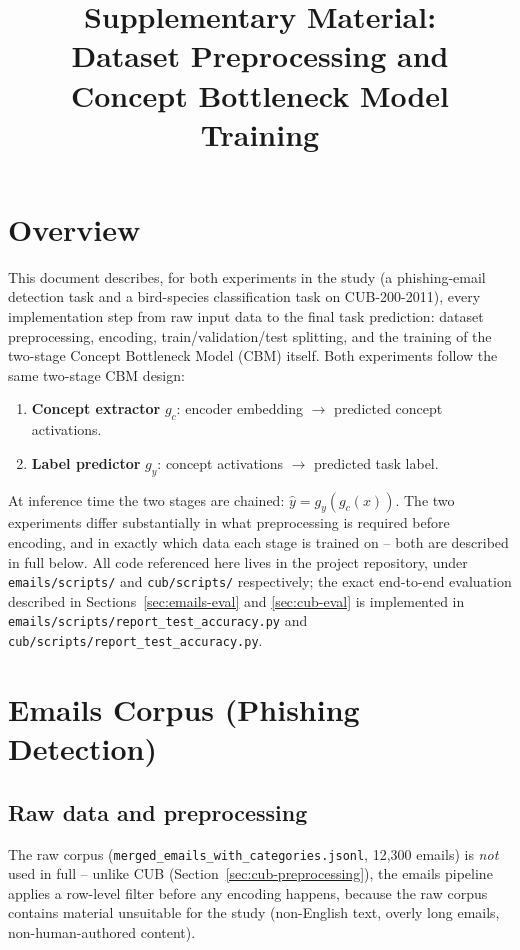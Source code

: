 \documentclass[11pt]{article}
\title{Supplementary Material:\\Dataset Preprocessing and Concept Bottleneck Model Training}
\author{}
\date{}
\newcommand{\code}[1]{\texttt{#1}}
\begin{document}
\maketitle

\section{Overview}

This document describes, for both experiments in the study (a phishing-email
detection task and a bird-species classification task on CUB-200-2011),
every implementation step from raw input data to the final task prediction:
dataset preprocessing, encoding, train/validation/test splitting, and the
training of the two-stage Concept Bottleneck Model (CBM) itself. Both
experiments follow the same two-stage CBM design:
\begin{enumerate}
    \item \textbf{Concept extractor} $g_c$: encoder embedding $\rightarrow$
    predicted concept activations.
    \item \textbf{Label predictor} $g_y$: concept activations $\rightarrow$
    predicted task label.
\end{enumerate}
At inference time the two stages are chained: $\hat{y} = g_y(g_c(x))$. The
two experiments differ substantially in what preprocessing is required
before encoding, and in exactly which data each stage is trained on --
both are described in full below. All code referenced here lives in the
project repository, under \code{emails/scripts/} and \code{cub/scripts/}
respectively; the exact end-to-end evaluation described in
Sections~\ref{sec:emails-eval} and \ref{sec:cub-eval} is implemented in
\code{emails/scripts/report\_test\_accuracy.py} and
\code{cub/scripts/report\_test\_accuracy.py}.

\section{Emails Corpus (Phishing Detection)}

\subsection{Raw data and preprocessing}
\label{sec:emails-preprocessing}

The raw corpus (\code{merged\_emails\_with\_categories.jsonl}, 12{,}300
emails) is \emph{not} used in full -- unlike CUB (Section~\ref{sec:cub-preprocessing}),
the emails pipeline applies a row-level filter before any encoding happens,
because the raw corpus contains material unsuitable for the study
(non-English text, overly long emails, non-human-authored content).
\end{document}
